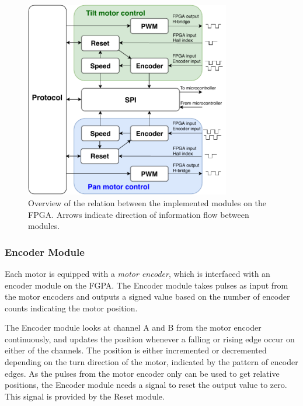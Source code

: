 \documentclass[../../main.tex]{subfiles}
\begin{document}
\begin{figure}
    \centering
    \includegraphics[width=0.8\textwidth]{Sections/System_Implementation/Images/FPGALogicBothMotors.pdf}
    \caption{Overview of the relation between the implemented modules on the FPGA. Arrows indicate direction of information flow between modules.}
    \label{fig:FPGALogicBothMotors}
\end{figure}




\subsubsection*{Encoder Module}

Each motor is equipped with a \textit{motor encoder}, which is interfaced with an encoder module on the FGPA. The Encoder module takes pulses as input from the motor encoders and outputs a signed value based on the number of encoder counts indicating the motor position. 

The Encoder module looks at channel A and B from the motor encoder continuously, and updates the position whenever a falling or rising edge occur on either of the channels. The position is either incremented or decremented depending on the turn direction of the motor, indicated by the pattern of encoder edges.     
As the pulses from the motor encoder only can be used to get relative positions, the Encoder module needs a signal to reset the output value to zero. This signal is provided by the Reset module. 
\end{document}
